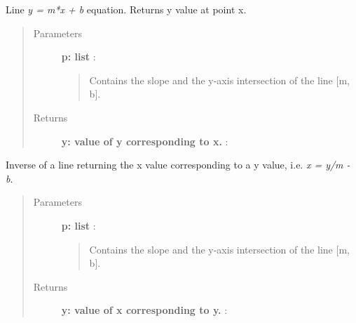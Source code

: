 \documentclass[a4paper,10pt,english]{sphinxmanual}
\begin{document}

\begin{fulllineitems}
\label{functions:astrolyze.functions.astro_functions.line}
Line \emph{y = m*x + b} equation. Returns y value at point x.
\begin{quote}\begin{description}
\item[{Parameters }] \leavevmode
\textbf{p: list} :
\begin{quote}

Contains the slope and the y-axis intersection of the line {[}m, b{]}.
\end{quote}

\item[{Returns }] \leavevmode
\textbf{y: value of y corresponding to x.} :

\end{description}\end{quote}

\end{fulllineitems}


\begin{fulllineitems}
\label{functions:astrolyze.functions.astro_functions.anti_line}
Inverse of a line returning the x value corresponding to a y value, i.e.
\emph{x = y/m - b}.
\begin{quote}\begin{description}
\item[{Parameters }] \leavevmode
\textbf{p: list} :
\begin{quote}

Contains the slope and the y-axis intersection of the line {[}m, b{]}.
\end{quote}

\item[{Returns }] \leavevmode
\textbf{y: value of x corresponding to y.} :

\end{description}\end{quote}

\end{fulllineitems}
\end{document}
